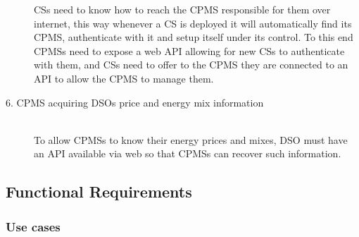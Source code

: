 \documentclass[11pt]{article}
\begin{document}
\begin{description}
        CSs need to know how to reach the CPMS responsible for them over internet, this way whenever a CS is deployed it will automatically find its CPMS, authenticate with it and setup itself under its control. To this end CPMSs need to expose a web API allowing for new CSs to authenticate with them, and CSs need to offer to the CPMS they are connected to an API to allow the CPMS to manage them.
    \item [6. CPMS acquiring DSOs price and energy mix information] \hfill \\
        To allow CPMSs to know their energy prices and mixes, DSO must have an API available via web so that CPMSs can recover such information.
\end{description}

\newpage

\subsection{Functional Requirements}

\subsubsection{Use cases}
\end{document}
